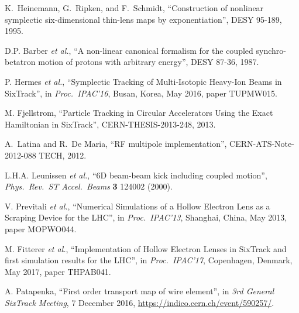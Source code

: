 \documentclass[a4paper,
              ]{jacow}
\begin{document}
\begin{thebibliography}{99}
K.~Heinemann, G.~Ripken, and F.~Schmidt,
``Construction of nonlinear symplectic six-dimensional thin-lens maps by exponentiation'',
DESY 95-189, 1995.

D.P. Barber {\it et al.},
``A non-linear canonical formalism for the coupled synchro-betatron motion of protons with arbitrary energy'',
DESY 87-36, 1987.

 P. Hermes {\it et al.},
``Symplectic Tracking of Multi-Isotopic Heavy-Ion Beams in SixTrack'', in \textit{Proc.~IPAC'16}, Busan, Korea, May 2016, paper TUPMW015.

M. Fjellstrom, ``Particle Tracking in Circular Accelerators Using the Exact Hamiltonian in SixTrack'', CERN-THESIS-2013-248, 2013.

A.~Latina and R.~De Maria, ``RF multipole implementation'', CERN-ATS-Note-2012-088 TECH, 2012.

L.H.A. Leunissen {\it et al.}, ``6D beam-beam kick including coupled motion'', {\it Phys.\ Rev.\ ST Accel.\ Beams} {\bf 3} 124002 (2000).

V. Previtali {\it et al.},
``Numerical Simulations of a Hollow Electron Lens as a Scraping Device for the LHC'',
in \textit{Proc.~IPAC'13}, Shanghai, China, May 2013, paper MOPWO044.


M. Fitterer {\it et al.},
``Implementation of Hollow Electron Lenses in SixTrack and first simulation results for the LHC'',
in \textit{Proc.~IPAC'17}, Copenhagen, Denmark, May 2017, paper THPAB041.



A. Patapenka,
``First order transport map of wire element'',
in \textit{3rd General SixTrack Meeting}, 7 December 2016, \url{https://indico.cern.ch/event/590257/}.


\end{thebibliography}
\end{document}
